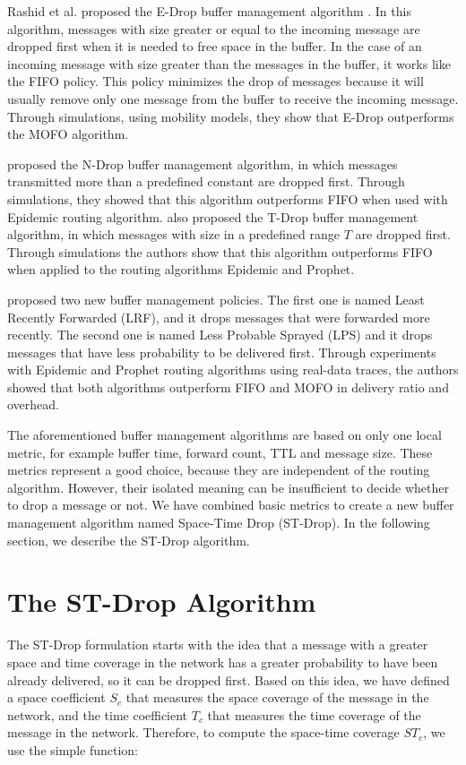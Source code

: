 Rashid et {al.} proposed the E-Drop buffer management algorithm \cite{rashid2011drop}. In this algorithm, messages with size greater or equal to the incoming message are dropped first
when it is needed to free space in the buffer. In the case of an incoming message with size greater than the messages in the buffer, it works like the FIFO policy. This policy minimizes
the drop of messages because it will usually remove only one message from the buffer to receive the incoming message. Through simulations, using mobility models, they show that E-Drop
outperforms the MOFO algorithm.

\cite{li2009n} proposed the N-Drop buffer management algorithm, in which messages transmitted more than a predefined constant are dropped first. Through simulations, they
showed that this algorithm outperforms FIFO when used with Epidemic routing algorithm. \cite{ayub2010t} also proposed the T-Drop buffer management algorithm, in which
messages with size in a predefined range $T$ are dropped first. Through simulations the authors show that this algorithm outperforms FIFO when applied to the routing algorithms Epidemic
and Prophet.

\cite{naves2012lps} proposed two new buffer management policies. The first one is named Least Recently Forwarded (LRF), and it drops messages that were forwarded more
recently. The second one is named Less Probable Sprayed (LPS) and it drops messages that have less probability to be delivered first. Through experiments with Epidemic and Prophet
routing algorithms using real-data traces, the authors showed that both algorithms outperform FIFO and MOFO in delivery ratio and overhead.

The aforementioned buffer management algorithms are based on only one local metric, for example buffer time, forward count, TTL and message size. These metrics represent a good choice,
because they are independent of the routing algorithm. However, their isolated meaning can be insufficient to decide whether to drop a message or not. We have combined basic metrics to
create a new buffer management algorithm named Space-Time Drop (ST-Drop). In the following section, we describe the ST-Drop algorithm.

\section{The ST-Drop Algorithm}
\label{sce:stDrop}

The ST-Drop formulation starts with the idea that a message with a greater space and time coverage in the network has a greater probability to have been already delivered, so it can
be dropped first. Based on this idea, we have defined a space coefficient $S_{c}$ that measures the space coverage of the message in the network, and the time coefficient $T_{c}$
that measures the time coverage of the message in the network. Therefore, to compute the space-time coverage $ST_{c}$, we use the simple function:

